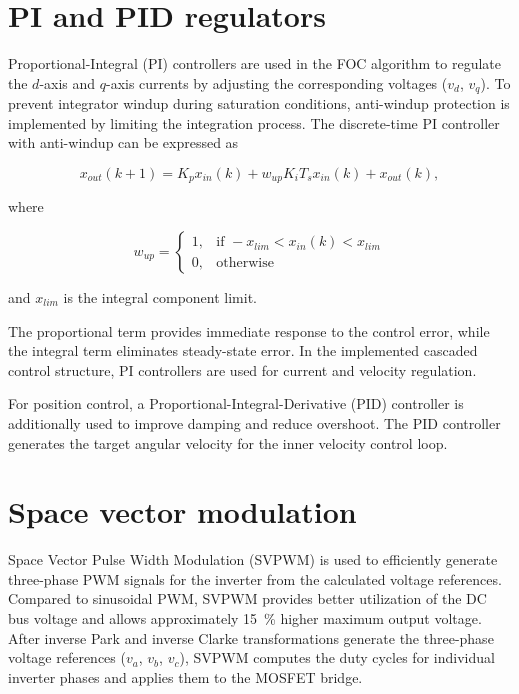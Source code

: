 \newpage
\section{PI and PID regulators}

Proportional-Integral (PI) controllers are used in the FOC algorithm to regulate the $d$-axis and $q$-axis currents by adjusting the corresponding voltages ($v_d$, $v_q$).
To prevent integrator windup during saturation conditions, anti-windup protection is implemented by limiting the integration process. 
The discrete-time PI controller with anti-windup can be expressed as

\begin{equation}
x_{out}(k+1) =
K_p x_{in}(k)
+
w_{up} K_i T_s x_{in}(k)
+
x_{out}(k),
\end{equation}

where

\begin{equation}
w_{up} =
\begin{cases}
1, & \text{if } -x_{lim} < x_{in}(k) < x_{lim} \\
0, & \text{otherwise}
\end{cases}
\end{equation}

and $x_{lim}$ is the integral component limit. \cite{prayogo_foc}

The proportional term provides immediate response to the control error, while the integral term eliminates steady-state error.
In the implemented cascaded control structure, PI controllers are used for current and velocity regulation.

For position control, a Proportional-Integral-Derivative (PID) controller is additionally used to improve damping and reduce overshoot.
The PID controller generates the target angular velocity for the inner velocity control loop. \cite{SimpleFOC}

\newpage

\section{Space vector modulation}

Space Vector Pulse Width Modulation (SVPWM) is used to efficiently generate three-phase PWM signals for the inverter from the calculated voltage references.
Compared to sinusoidal PWM, SVPWM provides better utilization of the DC bus voltage and allows approximately 15~\% higher maximum output voltage. \cite{svpwm_efficiency}
After inverse Park and inverse Clarke transformations generate the three-phase voltage references ($v_a$, $v_b$, $v_c$),
SVPWM computes the duty cycles for individual inverter phases and applies them to the MOSFET bridge.

